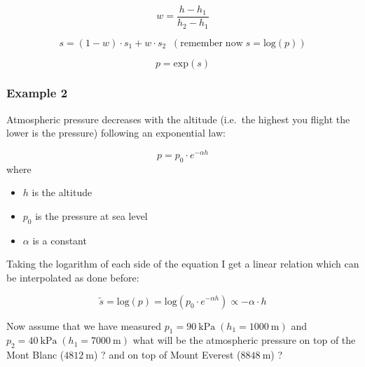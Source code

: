 \[w = \frac{h - h_1}{h_2 - h_1}\]

\[s = (1 - w)\cdot s_1 + w \cdot s_2\;\;(\mathrm{remember \;now }\;s = \mathrm{log}(p))\]

\[p = \mathrm{exp}(s)\]

\subsubsection{Example 2}\label{example-2}

Atmospheric pressure decreases with the altitude (i.e.~the highest you flight the lower is the pressure) following an exponential law:

\[p = p_0\cdot e^{-\alpha h}\]
where
\begin{itemize}
\tightlist
\item
  \(h\) is the altitude
\item
  \(p_0\) is the pressure at sea level
\item
  \(\alpha\) is a constant
\end{itemize}

Taking the logarithm of each side of the equation I get a linear relation which can be interpolated as done before:

\[\tilde{s} = \mathrm{log}(p) = \mathrm{log}(p_0\cdot e^{-\alpha h})\propto - \alpha \cdot h\]

Now assume that we have measured
\(p_1 = 90~\mathrm{kPa}\;(h_1 = 1000~\mathrm{m})\) and
\(p_2 = 40~\mathrm{kPa}\;(h_1 = 7000~\mathrm{m})\) what will be the
atmospheric pressure on top of the Mont Blanc (\(4812~\mathrm{m}\)) ? and on top of Mount Everest (\(8848~\mathrm{m}\)) ?

